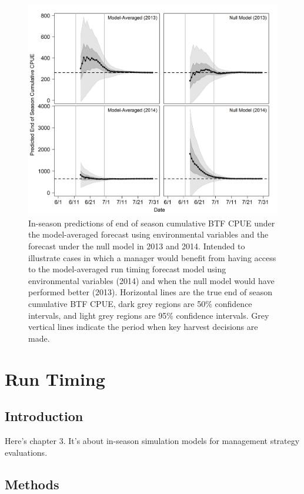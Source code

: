 \documentclass[12pt,]{book}
\theoremstyle{definition}
\theoremstyle{definition}
\theoremstyle{definition}
\theoremstyle{remark}
\begin{document}
\begin{figure}
  \centering
  \includegraphics{img/Ch2/eos-preds.png}
  \caption{In-season predictions of end of season cumulative BTF CPUE under the model-averaged forecast using environmental variables and the forecast under the null model in 2013 and 2014. Intended to illustrate cases in which a manager would benefit from having access to the model-averaged run timing forecast model using environmental variables (2014) and when the null model would have performed better (2013). Horizontal lines are the true end of season cumulative BTF CPUE, dark grey regions are 50$\%$ confidence intervals, and light grey regions are 95$\%$ confidence intervals. Grey vertical lines indicate the period when key harvest decisions are made.}
  \label{fig:eos-preds}
\end{figure}

\chapter{Run Timing}\label{ch3}

\section{Introduction}\label{introduction-1}

Here's chapter 3. It's about in-season simulation models for management
strategy evaluations.

\section{Methods}\label{methods-1}
\end{document}
